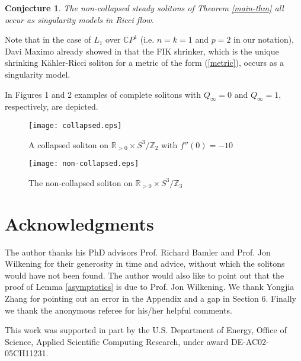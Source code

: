 \documentclass{amsart}
\newtheorem{conj}{Conjecture}
\theoremstyle{definition}
\theoremstyle{remark}
\numberwithin{equation}{section}
\newcommand{\R}{\mathbb{R}}  %
\begin{document}
\begin{conj}
The non-collapsed steady solitons of Theorem \ref{main-thm} all occur as singularity models in Ricci flow.
\end{conj}

Note that in the case of $L_1$ over $\mathbb{C}P^1$ (i.e. $n=k=1$ and $p=2$ in our notation), Davi Maximo already showed in \cite{M14} that the FIK shrinker, which is the unique shrinking K\"ahler-Ricci soliton for a metric of the form (\ref{metric}), occurs as a singularity model.

In Figures 1 and 2 examples of complete solitons with $Q_{\infty} = 0$ and $Q_{\infty} = 1$, respectively, are depicted. 

\begin{figure}[h]
\centering
\begin{minipage}{.5\textwidth}
\label{fig1}
\centering
\texttt{[image: collapsed.eps]}
\caption{A collapsed soliton on $\R_{>0}\times S^3/\mathbb{Z}_2$ with $f''(0) = -10$}
\end{minipage}%
\begin{minipage}{.5\textwidth}
\label{fig2}
\centering
\texttt{[image: non-collapsed.eps]}
\caption{The non-collapsed soliton on $\R_{>0}\times S^3/\mathbb{Z}_3$}
\end{minipage}
\end{figure}



\section*{Acknowledgments}
The author thanks his PhD advisors Prof. Richard Bamler and Prof. Jon Wilkening for their generosity in time and advice, without which the solitons would have not been found. The author would also like to point out that the proof of Lemma \ref{asymptotics} is due to Prof. Jon Wilkening. We thank Yongjia Zhang for pointing out an error in the Appendix and a gap in Section 6. Finally we thank the anonymous referee for his/her helpful comments.

This work was supported in part by the U.S. Department of Energy, Office of Science, Applied Scientific Computing Research, under award DE-AC02-05CH11231.
\end{document}
